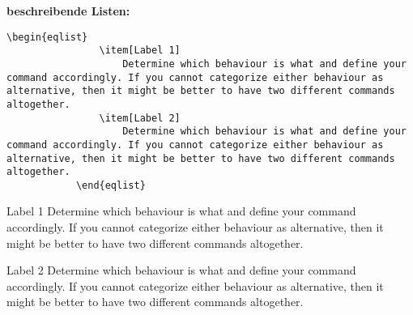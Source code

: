 \documentclass["WS\space 16-17\space -\space LaTeX-Kurs\space -\space Praesentation\space -\space 2.tex"]{subfiles}
\begin{document}
\begin{frame}[fragile]
    \textbf{\large{beschreibende Listen:}}\newline
    \Code*\vspace{-0.1cm}
        \begin{lstlisting}[gobble=12]
            \begin{eqlist}
                \item[Label 1]
                    Determine which behaviour is what and define your command accordingly. If you cannot categorize either behaviour as alternative, then it might be better to have two different commands altogether.
                \item[Label 2]
                    Determine which behaviour is what and define your command accordingly. If you cannot categorize either behaviour as alternative, then it might be better to have two different commands altogether.
            \end{eqlist}
        \end{lstlisting}
    \vspace{-0.3cm}
    \Ausgabe
        \begin{outputbox}
            \vspace{-0.2cm}
            \begin{eqlist}
                \item[Label 1]
                    Determine which behaviour is what and define your command accordingly. If you cannot categorize either behaviour as alternative, then it might be better to have two different commands altogether.
                \item[Label 2]
                    Determine which behaviour is what and define your command accordingly. If you cannot categorize either behaviour as alternative, then it might be better to have two different commands altogether.
            \end{eqlist}
            \vspace{-0.2cm}
        \end{outputbox}
\end{frame}
\end{document}

